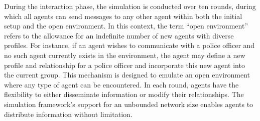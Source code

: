 During the interaction phase, the simulation is conducted over ten rounds, during which all agents can send messages to any other agent within both the initial setup and the open environment. In this context, the term ``open environment'' refers to the allowance for an indefinite number of new agents with diverse profiles. For instance, if an agent wishes to communicate with a police officer and no such agent currently exists in the environment, the agent may define a new profile and relationship for a police officer and incorporate this new agent into the current group. This mechanism is designed to emulate an open environment where any type of agent can be encountered. In each round, agents have the flexibility to either disseminate information or modify their relationships. The simulation framework's support for an unbounded network size enables agents to distribute information without limitation.



